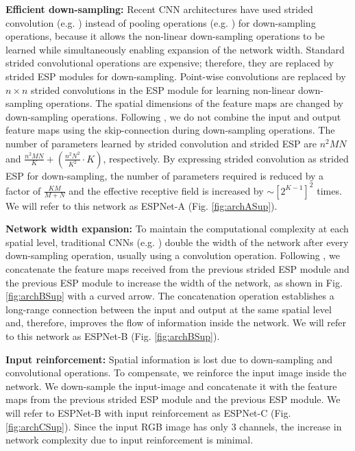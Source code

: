 \documentclass[runningheads]{llncs}
\def\Fig{Fig. }
\begin{document}
\noindent \textbf{Efficient down-sampling:} Recent CNN architectures have used strided convolution (e.g. \cite{springenberg2014striving,he2016deep,xie2017aggregated}) instead of pooling operations (e.g. \cite{simonyan2014very,krizhevsky2012imagenet}) for down-sampling operations, because it allows the non-linear down-sampling operations to be learned while simultaneously enabling expansion of the network width. Standard strided convolutional operations are expensive; therefore, they are replaced by strided ESP modules for down-sampling. Point-wise convolutions are replaced by  $n\times n$ strided convolutions in the ESP module for learning non-linear down-sampling operations. The spatial dimensions of the feature maps are changed by down-sampling operations. Following \cite{he2016deep,huang2017densely}, we do not combine the input and output feature maps using the skip-connection during down-sampling operations. The number of parameters learned by strided convolution and strided ESP are $n^2MN$ and $\frac{n^2MN}{K} + \left(\frac{n^2N^2}{K^2} \cdot K\right)$, respectively. By expressing strided convolution as strided ESP for down-sampling, the number of parameters required is reduced by a factor of $\frac{KM}{M + N}$ and the effective receptive field is increased by $\sim [2^{K-1}]^2$ times. We will refer to this network as ESPNet-A (\Fig \ref{fig:archASup}).

\noindent \textbf{Network width expansion:} To maintain the computational complexity at each spatial level, traditional CNNs (e.g. \cite{simonyan2014very,he2016deep,xie2017aggregated}) double the width of the network after every down-sampling operation, usually using a convolution operation. Following \cite{huang2017densely}, we concatenate the feature maps received from the previous strided ESP module and the previous ESP module to increase the width of the network, as shown in \Fig \ref{fig:archBSup} with a curved arrow. The concatenation operation establishes a long-range connection between the input and output at the same spatial level and, therefore, improves the flow of information inside the network. We will refer to this network as ESPNet-B (\Fig \ref{fig:archBSup}). 

\noindent \textbf{Input reinforcement:} Spatial information is lost due to down-sampling and convolutional operations. To compensate, we reinforce the input image inside the network. We down-sample the input-image and concatenate it with the feature maps from the previous strided ESP module and the previous ESP module. We will refer to ESPNet-B with input reinforcement as ESPNet-C (\Fig \ref{fig:archCSup}). Since the input RGB image has only 3 channels, the increase in network complexity due to input reinforcement is minimal.
\end{document}
